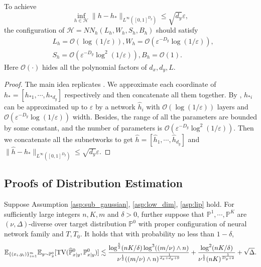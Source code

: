 \documentclass[11pt]{article}
\numberwithin{equation}{section}
\renewcommand{\P}{\mathbb{P}}
\begin{document}
\begin{prop}\label{prop:approximation_h}
    To achieve
    \begin{equation}
        \inf_{h\in\mathcal{H}} \|h-h_*\|_{L^\infty([0,1]^{D_y})}\leq \sqrt{d_y}\varepsilon,
    \end{equation}
    the configuration of $\mathcal{H}=NN_h(L_h,W_h,S_h,B_h)$ should satisfy 
    \begin{equation}
        \begin{aligned}
            &L_h=\mathcal{O}\left(\log(1/\varepsilon)\right), W_h=\mathcal{O}\left(\varepsilon^{-D_y}\log(1/\varepsilon)\right), \\
            &S_h=\mathcal{O}\left(\varepsilon^{-D_y}\log^2(1/\varepsilon)\right),
            B_h = \mathcal{O}(1).
        \end{aligned}
    \end{equation}
    Here $\mathcal{O}(\cdot)$ hides all the polynomial factors of $d_x,d_y,L$.  
\end{prop}

\begin{proof}
    The main idea replicates \citet[Theorem 1]{yarotsky2017error}.
    We approximate each coordinate of $h_*=[h_{*1},\cdots,h_{*d_y}]$ respectively and then concatenate all them together.
    By \citet[Theorem 1]{yarotsky2017error}, $h_{*i}$ can be approximated up to $\varepsilon$ by a network $\widehat{h}_i$ with $\mathcal{O}\left(\log(1/\varepsilon)\right)$ layers and $\mathcal{O}\left(\varepsilon^{-D_y}\log(1/\varepsilon)\right)$ width. 
    Besides, the range of all the parameters are bounded by some constant, and the number of parameters is $\mathcal{O}\left(\varepsilon^{-D_y}\log^2(1/\varepsilon)\right)$.
    Then we concatenate all the subnetworks to get $\widehat{h}=[\widehat{h}_1,\cdots,\widehat{h}_{d_y}]$ and $\|\widehat{h}-h_*\|_{L^\infty([0,1]^{D_y})}\leq \sqrt{d_y}\varepsilon$.
\end{proof}

\subsection{Proofs of Distribution Estimation}\label{app:subsec:dist_estimation}

\begin{thm}
\label{thm:distribution_diversity}
    Suppose Assumption \ref{asp:sub_gaussian}, \ref{asp:low_dim}, \ref{asp:lip} hold.
    For sufficiently large integers $n,K,m$ and $\delta>0$, further suppose that $\P^1,\cdots,\P^K$ are $(\nu,\Delta)$-diverse over target distribution $\P^0$ with proper configuration of neural network family and $T,T_0$. It holds that with probability no less than $1-\delta$,
    \begin{equation}
        \E_{\{(x_i,y_i)\}_{i=1}^m}\E_{y\sim\P^0_y} [\mathrm{TV}(\widehat{\P}^0_{x|y},\P^0_{x|y})]
        \lesssim \frac{\log^{\frac{5}{2}}(nK/\delta)\log^3((m/\nu)\wedge n)}{\nu^{\frac{1}{2}}((m/\nu)\wedge n)^{\frac{1}{d_x+d_y+9}}}+\frac{\log^2(nK/\delta)}{\nu^{\frac{1}{2}}(nK)^{\frac{1}{D_y+2}}}+\sqrt{\Delta}.
    \end{equation}
\end{thm}
\end{document}
